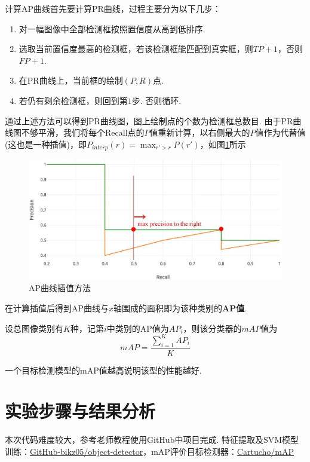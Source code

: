 \documentclass[12pt, a4paper, oneside]{ctexart}
\numberwithin{equation}{section}  %
\begin{document}
计算AP曲线首先要计算PR曲线，过程主要分为以下几步：
\begin{enumerate}
  \item 对一幅图像中全部检测框按照置信度从高到低排序.
  \item 选取当前置信度最高的检测框，若该检测框能匹配到真实框，则$TP+1$，否则$FP+1$.
  \item 在PR曲线上，当前框的绘制$(P,R)$点.
  \item 若仍有剩余检测框，则回到第$1$步. 否则循环.
\end{enumerate}
通过上述方法可以得到PR曲线图，图上绘制点的个数为检测框总数目. 由于PR曲线图不够平滑，我们将每个Recall点的$P$值重新计算，以右侧最大的$P$值作为代替值(这也是一种插值)，即$P_{interp}(r) = \max_{r' > r}P(r')$，如图\ref{fig-interp}所示
\begin{figure}[htbp]
  \centering
  \includegraphics[scale=1]{interp.jpg}
  \caption{AP曲线插值方法}
  \label{fig-interp}
\end{figure}
在计算插值后得到AP曲线与$x$轴围成的面积即为该种类别的\textbf{AP值}.

设总图像类别有$K$种，记第$i$中类别的AP值为$AP_i$，则该分类器的$mAP$值为
\begin{equation*}
mAP = \frac{\sum_{i=1}^K AP_i}{K}
\end{equation*}

一个目标检测模型的mAP值越高说明该型的性能越好.

\section{实验步骤与结果分析}
本次代码难度较大，参考老师教程使用GitHub中项目完成. 特征提取及SVM模型训练：\href{https://github.com/bikz05/object-detector/tree/master/object-detector}{GitHub-bikz05/object-detector}，mAP评价目标检测器：\href{https://github.com/Cartucho/mAP}{Cartucho/mAP}
\end{document}

